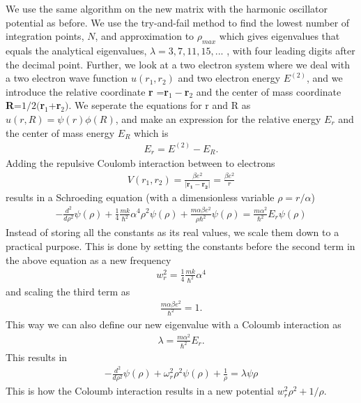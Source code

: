 \documentclass{article}
\begin{document}
We use the same algorithm on the new matrix with the harmonic oscillator potential as before. We use the try-and-fail method to find the lowest number of integration points, $N$, and approximation to $\rho_{max}$ which gives eigenvalues that equals the analytical eigenvalues, $\lambda=3, 7, 11, 15,...$ , with four leading digits after the decimal point.
\vskip0.7cm
Further, we look at a two electron system where we deal with a two electron wave function $u(r_1,r_2)$ and two electron energy $E^{(2)}$, and we introduce the relative coordinate \textbf{r} =\textbf{r}$_1-$\textbf{r}$_2$ and the center of mass coordinate \textbf{R}=$1/2($\textbf{r}$_1$+\textbf{r}$_2)$.
We seperate the equations for r and R as $u(r,R)=\psi(r)\phi(R)$, and make an expression for the relative energy $E_r$ and the center of mass energy $E_R$ which is
\begin{align*}
  E_r=E^{(2)}-E_R.
\end{align*}
Adding the repulsive Coulomb interaction between to electrons
\begin{align*}
  V(r_1,r_2)=\frac{\beta e^2}{|\boldsymbol{r_1}-\boldsymbol{r_2}|} = \frac{\beta e^2}{r}
\end{align*}
results in a Schroeding equation (with a dimensionless variable $\rho=r/\alpha$)
\begin{align}
  -\frac{d^2}{d\rho^2}\psi(\rho)+\frac{1}{4}\frac{mk}{\hbar^2}\alpha^4\rho^2\psi(\rho)+\frac{m\alpha\beta e^2}{\rho \hbar^2}\psi(\rho) = \frac{m\alpha^2}{\hbar^2}E_r\psi(\rho)
\end{align}
Instead of storing all the constants as its real values, we scale them down to a practical purpose. This is done by setting the constants before the second term in the above equation as a new frequency
\begin{align*}
  w_r^2=\frac{1}{4}\frac{mk}{\hbar^2}\alpha^4
\end{align*}
and scaling the third term as
\begin{align*}
  \frac{m\alpha \beta e^2}{\hbar^2}=1.
\end{align*}
This way we can also define our new eigenvalue with a Coloumb interaction as
\begin{align*}
  \lambda = \frac{m\alpha^2}{\hbar^2}E_r.
\end{align*}
This results in
\begin{align*}
  -\frac{d^2}{d\rho^2}\psi(\rho)+\omega_r^2\rho^2\psi(\rho) + \frac{1}{\rho}= \lambda \psi\rho
\end{align*}
This is how the Coloumb interaction results in a new potential $w_r^2\rho^2 + 1/\rho$.
\end{document}
